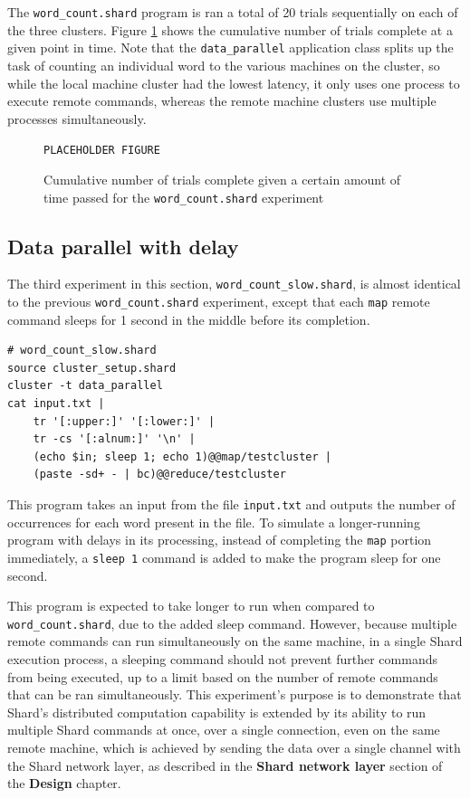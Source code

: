 \documentclass[twoside]{report}
\newcommand{\todoi}[1]{\todo[inline, color=blue!20]{TODO: {#1}}}
\begin{document}
The \texttt{word\_count.shard} program is ran a total of 20 trials sequentially on each of the three clusters. Figure \ref{fig:wordcount} shows the cumulative number of trials complete at a given point in time. Note that the \texttt{data\_parallel} application class splits up the task of counting an individual word to the various machines on the cluster, so while the local machine cluster had the lowest latency, it only uses one process to execute remote commands, whereas the remote machine clusters use multiple processes simultaneously.

\begin{figure}[h]
  \begin{center}
    \vspace{2cm}
    \texttt{PLACEHOLDER FIGURE}
    \vspace{2cm}
    \caption{Cumulative number of trials complete given a certain amount of time passed for the \texttt{word\_count.shard} experiment}
    \label{fig:wordcount}
  \end{center}
\end{figure}

\todoi{Some analysis on the actual results}

\subsection{Data parallel with delay}
The third experiment in this section, \texttt{word\_count\_slow.shard}, is almost identical to the previous \texttt{word\_count.shard} experiment, except that each \texttt{map} remote command sleeps for 1 second in the middle before its completion.

\begin{lstlisting}[language=Shard]
# word_count_slow.shard
source cluster_setup.shard
cluster -t data_parallel
cat input.txt |
    tr '[:upper:]' '[:lower:]' |
    tr -cs '[:alnum:]' '\n' |
    (echo $in; sleep 1; echo 1)@@map/testcluster |
    (paste -sd+ - | bc)@@reduce/testcluster
\end{lstlisting}

This program takes an input from the file \texttt{input.txt} and outputs the number of occurrences for each word present in the file.
To simulate a longer-running program with delays in its processing, instead of completing the \texttt{map} portion immediately, a \texttt{sleep 1} command is added to make the program sleep for one second.

This program is expected to take longer to run when compared to \texttt{word\_count.shard}, due to the added sleep command.
However, because multiple remote commands can run simultaneously on the same machine, in a single Shard execution process, a sleeping command should not prevent further commands from being executed, up to a limit based on the number of remote commands that can be ran simultaneously.
This experiment's purpose is to demonstrate that Shard's distributed computation capability is extended by its ability to run multiple Shard commands at once, over a single connection, even on the same remote machine, which is achieved by sending the data over a single channel with the Shard network layer, as described in the \textbf{Shard network layer} section of the \textbf{Design} chapter.
\end{document}
